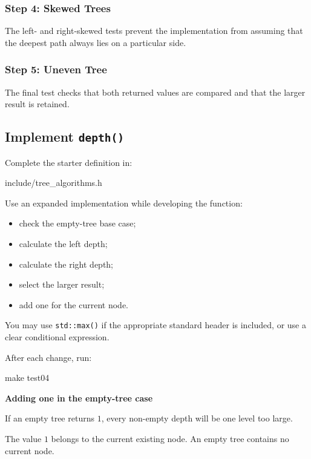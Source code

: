 \documentclass{csc2059practical}
\begin{document}
\subsubsection*{Step 4: Skewed Trees}

The left- and right-skewed tests prevent the implementation from assuming that
the deepest path always lies on a particular side.

\subsubsection*{Step 5: Uneven Tree}

The final test checks that both returned values are compared and that the
larger result is retained.

\subsection{Implement \texttt{depth()}}

Complete the starter definition in:

\begin{terminal}
include/tree_algorithms.h
\end{terminal}

Use an expanded implementation while developing the function:

\begin{itemize}
    \item check the empty-tree base case;
    \item calculate the left depth;
    \item calculate the right depth;
    \item select the larger result;
    \item add one for the current node.
\end{itemize}

You may use \texttt{std::max()} if the appropriate standard header is
included, or use a clear conditional expression.

After each change, run:

\begin{terminal}
make test04
\end{terminal}

\begin{commonerror}
\textbf{Adding one in the empty-tree case}

If an empty tree returns \(1\), every non-empty depth will be one level too
large.

The value \(1\) belongs to the current existing node. An empty tree contains no
current node.
\end{commonerror}
\end{document}
